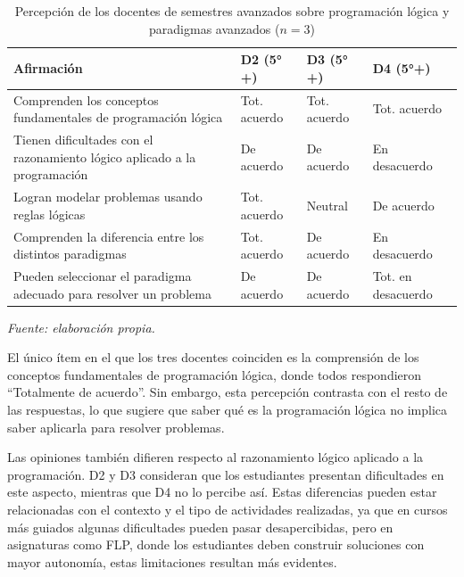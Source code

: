 \begin{table}[H]
\centering
\caption{Percepción de los docentes de semestres avanzados sobre programación lógica y paradigmas avanzados ($n=3$)}
\label{tabla:percepcion_paradigmas_docentes}
\footnotesize
\setlength{\tabcolsep}{3pt}

\begin{tabular}{
>{\raggedright\arraybackslash}p{7cm}
>{\centering\arraybackslash}p{2.5cm}
>{\centering\arraybackslash}p{2.5cm}
>{\centering\arraybackslash}p{2.5cm}
}
\hline
\textbf{Afirmación} & \textbf{D2 (5°+)} & \textbf{D3 (5°+)} & \textbf{D4 (5°+)} \\
\hline

Comprenden los conceptos fundamentales de programación lógica &
Tot. acuerdo &
Tot. acuerdo &
Tot. acuerdo \\

Tienen dificultades con el razonamiento lógico aplicado a la programación &
De acuerdo &
De acuerdo &
En desacuerdo \\

Logran modelar problemas usando reglas lógicas &
Tot. acuerdo &
Neutral &
De acuerdo \\

Comprenden la diferencia entre los distintos paradigmas &
Tot. acuerdo &
De acuerdo &
En desacuerdo \\

Pueden seleccionar el paradigma adecuado para resolver un problema &
De acuerdo &
De acuerdo &
Tot. en desacuerdo \\
\hline

\end{tabular}

\vskip 4pt
\footnotesize\textit{Fuente: elaboración propia.}
\end{table}

\FloatBarrier

El único ítem en el que los tres docentes coinciden es la comprensión de los conceptos fundamentales de programación lógica, donde todos respondieron ``Totalmente de acuerdo''. Sin embargo, esta percepción contrasta con el resto de las respuestas, lo que sugiere que saber qué es la programación lógica no implica saber aplicarla para resolver problemas.

Las opiniones también difieren respecto al razonamiento lógico aplicado a la programación. D2 y D3 consideran que los estudiantes presentan dificultades en este aspecto, mientras que D4 no lo percibe así. Estas diferencias pueden estar relacionadas con el contexto y el tipo de actividades realizadas, ya que en cursos más guiados algunas dificultades pueden pasar desapercibidas, pero en asignaturas como FLP, donde los estudiantes deben construir soluciones con mayor autonomía, estas limitaciones resultan más evidentes.

